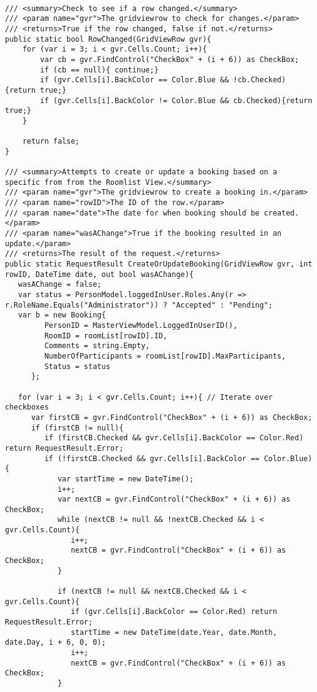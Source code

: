 \begin{lstlisting}[caption= ViewModel kode til oprettelse af booking]

/// <summary>Check to see if a row changed.</summary>
/// <param name="gvr">The gridviewrow to check for changes.</param>
/// <returns>True if the row changed, false if not.</returns>
public static bool RowChanged(GridViewRow gvr){
	for (var i = 3; i < gvr.Cells.Count; i++){
		var cb = gvr.FindControl("CheckBox" + (i + 6)) as CheckBox;
		if (cb == null){ continue;}
		if (gvr.Cells[i].BackColor == Color.Blue && !cb.Checked){return true;}
		if (gvr.Cells[i].BackColor != Color.Blue && cb.Checked){return true;}
	}

	return false;
}

/// <summary>Attempts to create or update a booking based on a specific from from the Roomlist View.</summary>
/// <param name="gvr">The gridviewrow to create a booking in.</param>
/// <param name="rowID">The ID of the row.</param>
/// <param name="date">The date for when booking should be created.</param>
/// <param name="wasAChange">True if the booking resulted in an update.</param>
/// <returns>The result of the request.</returns>
public static RequestResult CreateOrUpdateBooking(GridViewRow gvr, int rowID, DateTime date, out bool wasAChange){
   wasAChange = false;
   var status = PersonModel.loggedInUser.Roles.Any(r => r.RoleName.Equals("Administrator")) ? "Accepted" : "Pending";
   var b = new Booking{
         PersonID = MasterViewModel.LoggedInUserID(),
         RoomID = roomList[rowID].ID,
         Comments = string.Empty,
         NumberOfParticipants = roomList[rowID].MaxParticipants,
         Status = status
      };

   for (var i = 3; i < gvr.Cells.Count; i++){ // Iterate over checkboxes
      var firstCB = gvr.FindControl("CheckBox" + (i + 6)) as CheckBox;
      if (firstCB != null){
         if (firstCB.Checked && gvr.Cells[i].BackColor == Color.Red) return RequestResult.Error;
         if (!firstCB.Checked && gvr.Cells[i].BackColor == Color.Blue){
            var startTime = new DateTime();
            i++;
            var nextCB = gvr.FindControl("CheckBox" + (i + 6)) as CheckBox;
            while (nextCB != null && !nextCB.Checked && i < gvr.Cells.Count){
               i++;
               nextCB = gvr.FindControl("CheckBox" + (i + 6)) as CheckBox;
            }

            if (nextCB != null && nextCB.Checked && i < gvr.Cells.Count){
               if (gvr.Cells[i].BackColor == Color.Red) return RequestResult.Error;
               startTime = new DateTime(date.Year, date.Month, date.Day, i + 6, 0, 0);
               i++;
               nextCB = gvr.FindControl("CheckBox" + (i + 6)) as CheckBox;
            }


\end{lstlisting}
